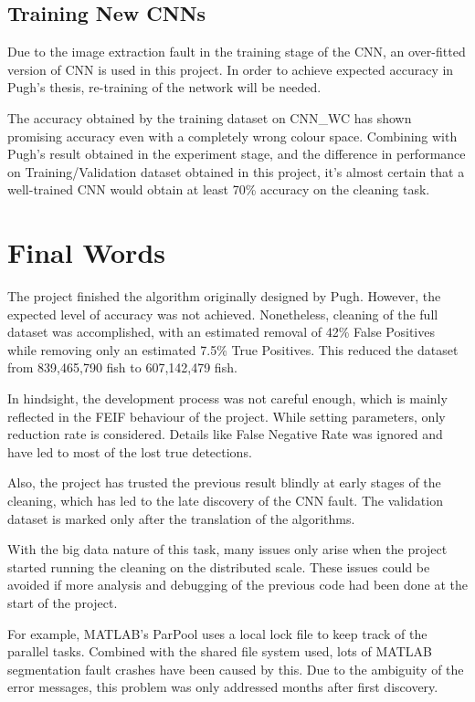 \documentclass[bsc,frontabs,twoside,fullspacing,parskip,deptreport]{infthesis}
\begin{document}
\subsection{Training New CNNs}

Due to the image extraction fault in the training stage of the CNN, an over-fitted version of CNN is used in this project. 
In order to achieve expected accuracy in Pugh's thesis\cite{Pugh}, re-training of the network will be needed.

The accuracy obtained by the training dataset on CNN\_WC has shown promising accuracy even with a completely wrong colour space. Combining with Pugh's result obtained in the experiment stage, and the difference in performance on Training/Validation dataset obtained in this project, it's almost certain that a well-trained CNN would obtain at least 70\% accuracy on the cleaning task. 

\section{Final Words}

The project finished the algorithm originally designed by Pugh. However, the expected level of accuracy was not achieved.
Nonetheless, cleaning of the full dataset was accomplished, with an estimated removal of 42\% False Positives while removing only an estimated 7.5\% True Positives. This reduced the dataset from 839,465,790 fish to 607,142,479 fish.

In hindsight, the development process was not careful enough, which is mainly reflected in the FEIF behaviour of the project. 
While setting parameters, only reduction rate is considered. 
Details like False Negative Rate was ignored and have led to most of the lost true detections.

Also, the project has trusted the previous result blindly at early stages of the cleaning, which has led to the late discovery of the CNN fault.
The validation dataset is marked only after the translation of the algorithms.

With the big data nature of this task, many issues only arise when the project started running the cleaning on the distributed scale.
These issues could be avoided if more analysis and debugging of the previous code had been done at the start of the project.

For example, MATLAB's ParPool uses a local lock file to keep track of the parallel tasks. 
Combined with the shared file system used, lots of MATLAB segmentation fault crashes have been caused by this. 
Due to the ambiguity of the error messages, this problem was only addressed months after first discovery.
\end{document}

